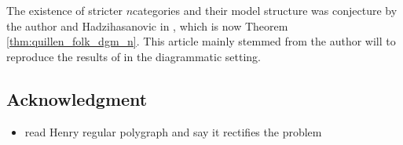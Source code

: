 The existence of stricter \( n \)\nbd categories and their model structure was conjecture by the author and Hadzihasanovic in \cite[Conjecture 6.3]{chanavat2024model}, which is now Theorem \ref{thm:quillen_folk_dgm_n}.
This article mainly stemmed from the author will to reproduce the results of \cite{ozornova2021nerves} in the diagrammatic setting. 

\subsection*{Acknowledgment}


\begin{itemize}
    \item read Henry regular polygraph and say it rectifies the problem
\end{itemize}


